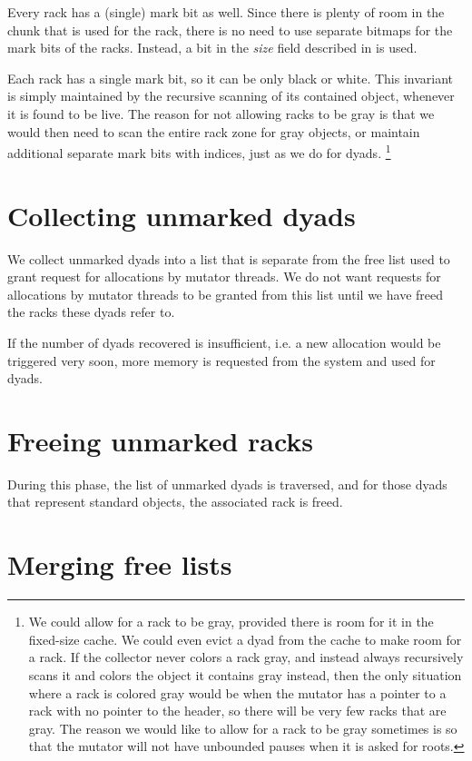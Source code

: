 Every rack has a (single) mark bit as well.  Since there is plenty of
room in the chunk that is used for the rack, there is no need to use
separate bitmaps for the mark bits of the racks.  Instead, a bit in
the \emph{size} field described in  is
used.

Each rack has a single mark bit, so it can be only black or white.
This invariant is simply maintained by the recursive scanning of its
contained object, whenever it is found to be live.  The reason for not
allowing racks to be gray is that we would then need to scan the
entire rack zone for gray objects, or maintain additional separate
mark bits with indices, just as we do for dyads.
\footnote{We could allow for a rack to be gray, provided there is room
  for it in the fixed-size cache.  We could even evict a dyad from the
  cache to make room for a rack.  If the collector never colors
  a rack gray, and instead always recursively scans it and colors the
  object it contains gray instead, then the only situation where a
  rack is colored gray would be when the mutator has a pointer to a
  rack with no pointer to the header, so there will be very few racks
  that are gray.  The reason we would like to allow for a rack to be
  gray sometimes is so that the mutator will not have unbounded pauses
  when it is asked for roots.}

\section{Collecting unmarked dyads}

We collect unmarked dyads into a list that is separate from the free
list used to grant request for allocations by mutator threads.  We do
not want requests for allocations by mutator threads to be granted
from this list until we have freed the racks these dyads refer to.

If the number of dyads recovered is insufficient, i.e. a new
allocation would be triggered very soon, more memory is requested from
the system and used for dyads.

\section{Freeing unmarked racks}

During this phase, the list of unmarked dyads is traversed, and for
those dyads that represent standard objects, the associated rack is
freed.

\section{Merging free lists}


